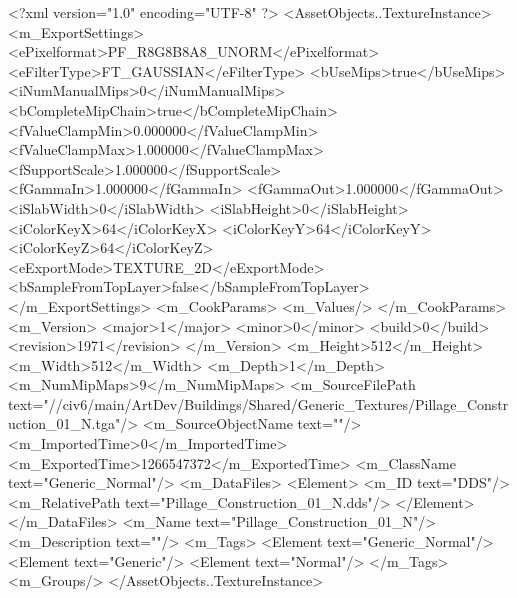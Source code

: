 <?xml version="1.0" encoding="UTF-8" ?>
<AssetObjects..TextureInstance>
	<m_ExportSettings>
		<ePixelformat>PF_R8G8B8A8_UNORM</ePixelformat>
		<eFilterType>FT_GAUSSIAN</eFilterType>
		<bUseMips>true</bUseMips>
		<iNumManualMips>0</iNumManualMips>
		<bCompleteMipChain>true</bCompleteMipChain>
		<fValueClampMin>0.000000</fValueClampMin>
		<fValueClampMax>1.000000</fValueClampMax>
		<fSupportScale>1.000000</fSupportScale>
		<fGammaIn>1.000000</fGammaIn>
		<fGammaOut>1.000000</fGammaOut>
		<iSlabWidth>0</iSlabWidth>
		<iSlabHeight>0</iSlabHeight>
		<iColorKeyX>64</iColorKeyX>
		<iColorKeyY>64</iColorKeyY>
		<iColorKeyZ>64</iColorKeyZ>
		<eExportMode>TEXTURE_2D</eExportMode>
		<bSampleFromTopLayer>false</bSampleFromTopLayer>
	</m_ExportSettings>
	<m_CookParams>
		<m_Values/>
	</m_CookParams>
	<m_Version>
		<major>1</major>
		<minor>0</minor>
		<build>0</build>
		<revision>1971</revision>
	</m_Version>
	<m_Height>512</m_Height>
	<m_Width>512</m_Width>
	<m_Depth>1</m_Depth>
	<m_NumMipMaps>9</m_NumMipMaps>
	<m_SourceFilePath text="//civ6/main/ArtDev/Buildings/Shared/Generic_Textures/Pillage_Construction_01_N.tga"/>
	<m_SourceObjectName text=""/>
	<m_ImportedTime>0</m_ImportedTime>
	<m_ExportedTime>1266547372</m_ExportedTime>
	<m_ClassName text="Generic_Normal"/>
	<m_DataFiles>
		<Element>
			<m_ID text="DDS"/>
			<m_RelativePath text="Pillage_Construction_01_N.dds"/>
		</Element>
	</m_DataFiles>
	<m_Name text="Pillage_Construction_01_N"/>
	<m_Description text=""/>
	<m_Tags>
		<Element text="Generic_Normal"/>
		<Element text="Generic"/>
		<Element text="Normal"/>
	</m_Tags>
	<m_Groups/>
</AssetObjects..TextureInstance>

